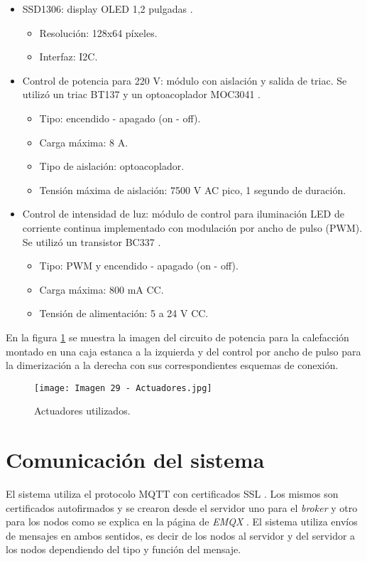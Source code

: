\begin{itemize}
\item SSD1306: display OLED 1,2 pulgadas \citep{33}.
	\begin{itemize}
		\item Resolución: 128x64 píxeles.
		\item Interfaz: I2C.
	\end{itemize}
	\item Control de potencia para 220 V: módulo con aislación y salida de triac. Se utilizó un triac BT137 \citep{34} y un optoacoplador MOC3041 \citep{35}.
	\begin{itemize}
		\item Tipo: encendido - apagado (on - off).
		\item Carga máxima: 8 A.
		\item Tipo de aislación: optoacoplador.
		\item Tensión máxima de aislación: 7500 V AC pico, 1 segundo de duración.
	\end{itemize}
	\item Control de intensidad de luz: módulo de control para iluminación LED de corriente continua implementado con modulación por ancho de pulso (PWM). Se utilizó un transistor BC337 \citep{36}.
	\begin{itemize}
		\item Tipo: PWM y encendido - apagado (on - off).
		\item Carga máxima: 800 mA CC.
		\item Tensión de alimentación: 5 a 24 V CC.
	\end{itemize}
\end{itemize}

En la figura \ref{fig:29} se muestra la imagen del circuito de potencia para la calefacción montado en una caja estanca a la izquierda y del control por ancho de pulso para la dimerización a la derecha con sus correspondientes esquemas de conexión.

\begin{figure}[h]
\centering
\texttt{[image: Imagen 29 - Actuadores.jpg]}
\caption[Actuadores]{Actuadores utilizados.}
\label{fig:29}
\end{figure}

\section{Comunicación del sistema}

El sistema utiliza el protocolo MQTT con certificados SSL \citep{37}. Los mismos son certificados autofirmados y se crearon desde el servidor uno para el \textit{broker} y otro para los nodos como se explica en la página de \textit{EMQX} \citep{38}. El sistema utiliza envíos de mensajes en ambos sentidos, es decir de los nodos al servidor y del servidor a los nodos dependiendo del tipo y función del mensaje.

